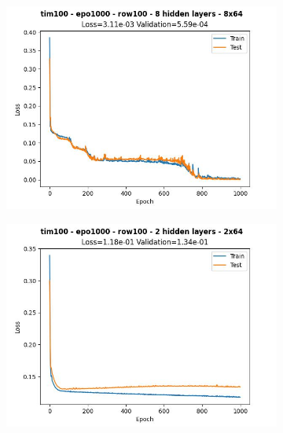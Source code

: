 \begin{figure}[H]
    \centering
    \begin{subfigure}{.47\linewidth}
        \centering
        \includegraphics[width=\textwidth]{other-models/2024-05-20T21:22:03.335555_pendulum_tim100_epo1000_row100.jpg}
    \end{subfigure}
    \begin{subfigure}{.47\linewidth}
        \centering
        \includegraphics[width=\textwidth]{other-models/2024-05-20T21:20:32.068311_pendulum_tim100_epo1000_row100.jpg}
    \end{subfigure}
    \begin{subfigure}{.47\linewidth}
        \centering

\end{subfigure}
\end{figure}
